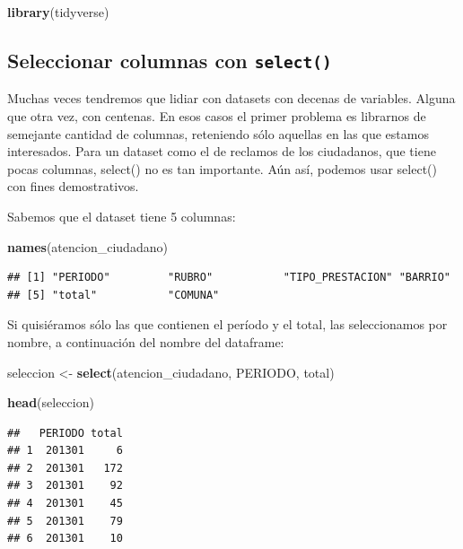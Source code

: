 \documentclass[]{book}
\newenvironment{Shaded}{\begin{snugshade}}{\end{snugshade}}
\newcommand{\KeywordTok}[1]{\textcolor[rgb]{0.13,0.29,0.53}{\textbf{#1}}}
\newcommand{\StringTok}[1]{\textcolor[rgb]{0.31,0.60,0.02}{#1}}
\newcommand{\NormalTok}[1]{#1}
\begin{document}
\begin{Shaded}
\begin{Highlighting}[]
\KeywordTok{library}\NormalTok{(tidyverse)}
\end{Highlighting}
\end{Shaded}

\subsection{\texorpdfstring{Seleccionar columnas con
\texttt{select()}}{Seleccionar columnas con select()}}\label{seleccionar-columnas-con-select}

Muchas veces tendremos que lidiar con datasets con decenas de variables.
Alguna que otra vez, con centenas. En esos casos el primer problema es
librarnos de semejante cantidad de columnas, reteniendo sólo aquellas en
las que estamos interesados. Para un dataset como el de reclamos de los
ciudadanos, que tiene pocas columnas, select() no es tan importante. Aún
así, podemos usar select() con fines demostrativos.

Sabemos que el dataset tiene 5 columnas:

\begin{Shaded}
\begin{Highlighting}[]
\KeywordTok{names}\NormalTok{(atencion_ciudadano)}
\end{Highlighting}
\end{Shaded}

\begin{verbatim}
## [1] "PERIODO"         "RUBRO"           "TIPO_PRESTACION" "BARRIO"         
## [5] "total"           "COMUNA"
\end{verbatim}

Si quisiéramos sólo las que contienen el período y el total, las
seleccionamos por nombre, a continuación del nombre del dataframe:

\begin{Shaded}
\begin{Highlighting}[]
\NormalTok{seleccion <-}\StringTok{ }\KeywordTok{select}\NormalTok{(atencion_ciudadano, PERIODO, total)}

\KeywordTok{head}\NormalTok{(seleccion)}
\end{Highlighting}
\end{Shaded}

\begin{verbatim}
##   PERIODO total
## 1  201301     6
## 2  201301   172
## 3  201301    92
## 4  201301    45
## 5  201301    79
## 6  201301    10
\end{verbatim}
\end{document}
